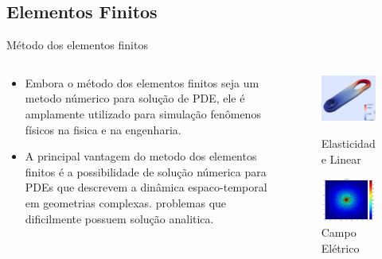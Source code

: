 \documentclass{beamer}
\begin{document}
		\subsection{Elementos Finitos}
		\begin{frame}{Método dos elementos finitos}
			\begin{columns}
				\begin{column}{0.5\textwidth}
						\begin{itemize}[<+->]
						\item Embora o método dos elementos finitos seja um metodo númerico para solução de PDE, ele é amplamente utilizado para simulação fenômenos físicos na fisica e na engenharia.
						\item A principal vantagem do metodo dos elementos finitos é a possibilidade de solução númerica para PDEs que descrevem a dinâmica espaco-temporal em geometrias complexas. problemas que dificilmente possuem solução analitica.
						\end{itemize}
				\end{column}
				\begin{column}{0.5\textwidth}
					\begin{figure}
						\includegraphics[width=0.5\linewidth]{fe1}
						\caption{Elasticidade Linear}
						\includegraphics[width=0.5\linewidth]{fe2}
						\caption{Campo Elétrico}				
					\end{figure}
				\end{column}
			\end{columns}
		\end{frame}
\end{document}
